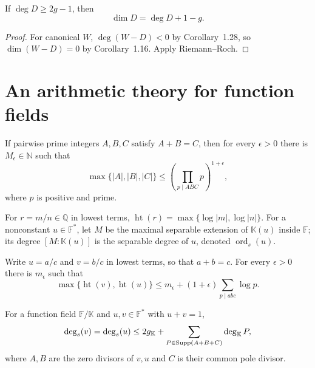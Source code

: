\begin{corollary}
\label{par-cor-high-degree-rr}
\uses{}
If $\deg D\geq2g-1$, then
\[
\dim D=\deg D+1-g.
\]
\end{corollary}
\begin{proof}
For canonical $W$, $\deg(W-D)<0$ by Corollary~1.28, so
$\dim(W-D)=0$ by Corollary~1.16. Apply Riemann--Roch.
\end{proof}

\section{An arithmetic theory for function fields}

\begin{conjecture}[ABC I]
\label{par-conj-abc-I}
\uses{}
If pairwise prime integers $A,B,C$ satisfy $A+B=C$, then for every $\epsilon>0$
there is $M_\epsilon\in\mathbb N$ such that
\[
\max\{|A|,|B|,|C|\}\leq
\left(\prod_{p\mid ABC}p\right)^{1+\epsilon},
\]
where $p$ is positive and prime.
\end{conjecture}

\begin{definition}
\label{par-def-height-separable-degree}
\uses{}
For $r=m/n\in\mathbb Q$ in lowest terms,
$\operatorname{ht}(r)=\max\{\log|m|,\log|n|\}$. For a nonconstant
$u\in\mathbb F^*$, let $M$ be the maximal separable extension of $\mathbb K(u)$
inside $\mathbb F$; its degree $[M:\mathbb K(u)]$ is the separable degree of
$u$, denoted $\operatorname{ord}_s(u)$.
\end{definition}

\begin{conjecture}[ABC II]
\label{par-conj-abc-II}
\uses{}
Write $u=a/c$ and $v=b/c$ in lowest terms, so that $a+b=c$.  For every
$\epsilon>0$ there is $m_\epsilon$ such that
\[
\max\{\operatorname{ht}(v),\operatorname{ht}(u)\}
\leq m_\epsilon+(1+\epsilon)\sum_{p\mid abc}\log p.
\]
\end{conjecture}

\begin{theorem}
\label{par-thm-function-field-abc}
\uses{}
For a function field $\mathbb F/\mathbb K$ and $u,v\in\mathbb F^*$ with
$u+v=1$,
\[
\operatorname{deg}_{s}(v)=\operatorname{deg}_{s}(u)\leq
2g_{\mathbb K}+\sum_{P\in\operatorname{Supp}(A+B+C)}\deg_{\mathbb K}P,
\]
where $A,B$ are the zero divisors of $v,u$ and $C$ is their common pole divisor.
\end{theorem}


